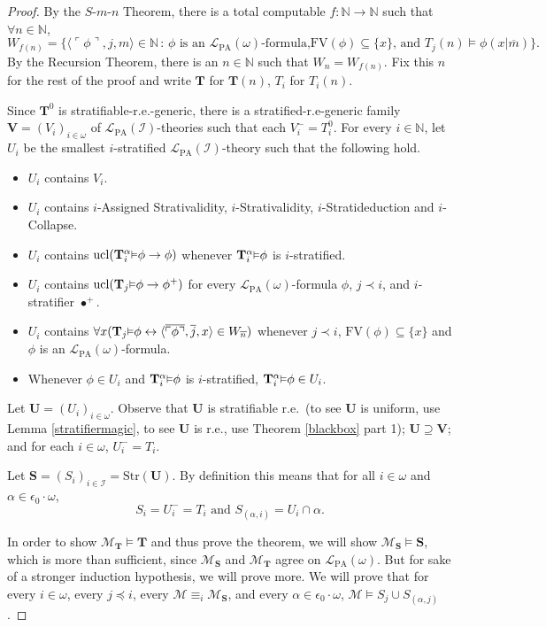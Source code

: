 \documentclass[reqno]{article}
\theoremstyle{definition}
\def\N{\mathbb{N}}
\def\L{\mathscr{L}}
\def\M{\mathscr{M}}
\def\T{\mathbf{T}}
\def\S{\mathbf{S}}
\def\U{\mathbf{U}}
\def\V{\mathbf{V}}
\def\FV{\mathrm{FV}}
\def\LPA{\L_{\mathrm{PA}}}
\def\epom{\epsilon_0\cdot\omega}
\def\indset{\mathcal I}
\def\myequiv{\equiv}
\renewcommand{\Pr}[1]{\T_{#1}\mbox{\small${\vDash}$}}
\newcommand{\Prr}[2]{\T^{#1}_{#2}\mbox{\small${\vDash}$}}
\newcommand{\ucl}[1]{\mathrm{ucl}(#1)}
\newcommand{\str}[1]{\mathrm{Str}(#1)} \newcommand{\Str}[1]{\str{#1}}
\begin{document}
\begin{proof}
By the $S$-$m$-$n$ Theorem, there is a total computable $f:\N\to\N$ such that $\forall n\in\N$,
\[
W_{f(n)}=\{\langle\ulcorner\phi\urcorner,j,m\rangle\in\N\,:\,\mbox{$\phi$ is an $\LPA(\omega)$-formula,
$\FV(\phi)\subseteq\{x\}$, and $T_j(n)\models\phi(x|\overline m)$}\}.
\]
By the Recursion Theorem, there is an $n\in\N$ such that $W_n=W_{f(n)}$.  Fix this $n$ for the rest of the proof
and write $\T$ for $\T(n)$, $T_i$ for $T_i(n)$.

Since $\T^0$ is stratifiable-r.e.-generic, there is 
a stratified-r.e-generic
family $\V=(V_i)_{i\in\omega}$ of $\LPA(\indset)$-theories such that each $V^-_i=T^0_i$.
For every $i\in\N$, let $U_i$ be the smallest
$i$-stratified $\LPA(\indset)$-theory such that the following hold.
\begin{itemize}
\item $U_i$ contains $V_i$.
\item $U_i$ contains $i$-Assigned Strativalidity, $i$-Strativalidity, $i$-Stratideduction and $i$-Collapse.
\item $U_i$ contains $\ucl{\Prr\alpha i\phi\rightarrow\phi}$ whenever $\Prr\alpha i\phi$ is $i$-stratified.
\item $U_i$ contains $\ucl{\Pr j\phi\rightarrow\phi^+}$ for every $\LPA(\omega)$-formula $\phi$, $j\prec i$,
and $i$-stratifier $\bullet^+$.
\item $U_i$ contains $\forall x(\Pr j\phi\leftrightarrow\langle\overline{\ulcorner\phi\urcorner},\overline j,x\rangle\in W_{\overline n})$
whenever $j\prec i$, $\FV(\phi)\subseteq\{x\}$ and $\phi$ is an $\LPA(\omega)$-formula.
\item Whenever $\phi\in U_i$ and $\Prr\alpha i\phi$ is $i$-stratified, $\Prr\alpha i\phi\in U_i$.
\end{itemize}
Let $\U=(U_i)_{i\in\omega}$.  Observe that $\U$ is stratifiable r.e.~(to see $\U$ is uniform, use
Lemma \ref{stratifiermagic}, to see $\U$ is r.e., use Theorem \ref{blackbox} part 1); $\U\supseteq\V$; and for each $i\in\omega$,
$U_i^-=T_i$.


Let $\S=(S_i)_{i\in\indset}=\str{\U}$.
By definition this means that for all $i\in\omega$ and $\alpha\in\epom$,
\[S_i=U_i^-=T_i\mbox{ and }S_{(\alpha,i)}=U_i\cap\alpha.
\]

In order to show $\M_\T\models\T$ and thus prove the theorem,
we will show $\M_\S\models\S$, which is more than sufficient, since 
$\M_\S$ and $\M_\T$ agree on $\LPA(\omega)$.
But for sake of a stronger induction hypothesis, we will prove 
more.  We will prove that for every $i\in\omega$, every $j\preceq i$,
every $\M\myequiv_i\M_\S$, and every $\alpha\in\epom$,
$\M\models S_j\cup S_{(\alpha,j)}$.


\end{proof}
\end{document}
